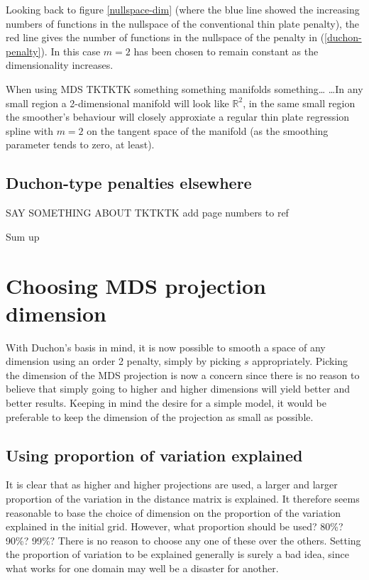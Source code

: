 Looking back to figure \ref{nullspace-dim} (where the blue line showed the increasing numbers of functions in the nullspace of the conventional thin plate penalty), the red line gives the number of functions in the nullspace of the penalty in (\ref{duchon-penalty}). In this case $m=2$ has been chosen to remain constant as the dimensionality increases.

When using MDS TKTKTK something something manifolds something\ldots 
\ldots In any small region a 2-dimensional manifold will look like $\mathbb{R}^2$, in the same small region the smoother's behaviour will closely approxiate a regular thin plate regression spline with $m=2$ on the tangent space of the manifold (as the smoothing parameter tends to zero, at least).




\subsection{Duchon-type penalties elsewhere}
SAY SOMETHING ABOUT \cite{girosi} TKTKTK add page numbers to ref




Sum up










\section{Choosing MDS projection dimension}

With Duchon's basis in mind, it is now possible to smooth a space of any dimension using an order 2 penalty, simply by picking $s$ appropriately. Picking the dimension of the MDS projection is now a concern since there is no reason to believe that simply going to higher and higher dimensions will yield better and better results. Keeping in mind the desire for a simple model, it would be preferable to keep the dimension of the projection as small as possible.

\subsection{Using proportion of variation explained}

It is clear that as higher and higher projections are used, a larger and larger proportion of the variation in the distance matrix is explained. It therefore seems reasonable to base the choice of dimension on the proportion of the variation explained in the initial grid. However, what proportion should be used? 80\%? 90\%? 99\%? There is no reason to choose any one of these over the others. Setting the proportion of variation to be explained generally is surely a bad idea, since what works for one domain may well be a disaster for another.


